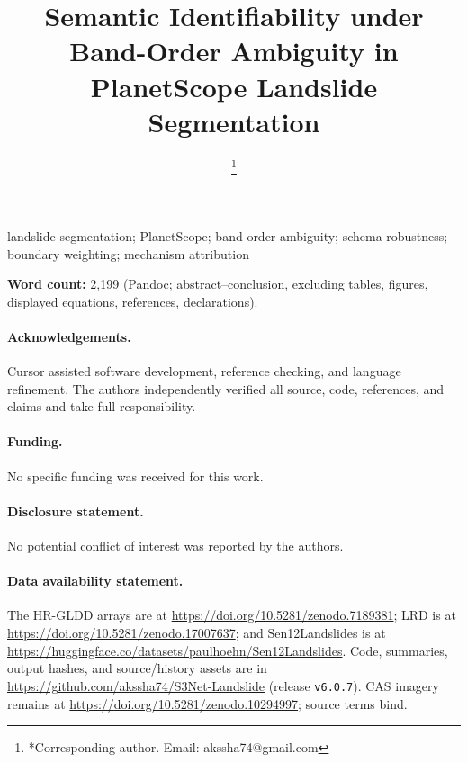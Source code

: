 \documentclass[]{interact}
\begin{document}
\history{}

\title{Semantic Identifiability under Band-Order Ambiguity in PlanetScope Landslide Segmentation}

\author{
\thanks{*Corresponding author. Email: akssha74@gmail.com}
}

\maketitle

\begin{abstract}

\end{abstract}

\begin{keywords}
landslide segmentation; PlanetScope; band-order ambiguity; schema robustness; boundary weighting; mechanism attribution
\end{keywords}

\noindent\textbf{Word count:} 2,199 (Pandoc; abstract--conclusion, excluding tables, figures, displayed equations, references, declarations).










\paragraph*{Acknowledgements.}
Cursor assisted software development, reference checking, and language refinement. The authors independently verified all source, code, references, and claims and take full responsibility.

\paragraph*{Funding.}
No specific funding was received for this work.

\paragraph*{Disclosure statement.}
No potential conflict of interest was reported by the authors.

\paragraph*{Data availability statement.}
The HR-GLDD arrays are at \url{https://doi.org/10.5281/zenodo.7189381}; LRD is at \url{https://doi.org/10.5281/zenodo.17007637}; and Sen12Landslides is at \url{https://huggingface.co/datasets/paulhoehn/Sen12Landslides}. Code, summaries, output hashes, and source/history assets are in \url{https://github.com/akssha74/S3Net-Landslide} (release \texttt{v6.0.7}). CAS imagery remains at \url{https://doi.org/10.5281/zenodo.10294997}; source terms bind.



\end{document}
